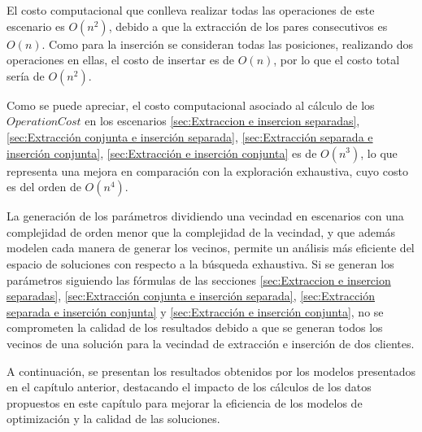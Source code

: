 \documentclass[12pt]{report}
\begin{document}
	El costo computacional que conlleva realizar todas las operaciones de este escenario es $O(n^2)$, debido a que la extracción de los pares consecutivos es $O(n)$. Como para la inserción se consideran todas las posiciones, realizando dos operaciones en ellas, el costo de insertar es de $O(n)$, por lo que el costo total sería de $O(n^2)$.

	Como se puede apreciar, el costo computacional asociado al cálculo de los $OperationCost$ en los escenarios \ref{sec:Extraccion e insercion separadas}, \ref{sec:Extracción conjunta e inserción separada}, \ref{sec:Extracción separada e inserción conjunta}, \ref{sec:Extracción e inserción conjunta} es de $O(n^3)$, lo que representa una mejora en comparación con la exploración exhaustiva, cuyo costo es del orden de $O(n^4)$.

	La generación de los parámetros dividiendo una vecindad en escenarios con una complejidad de orden menor que la complejidad de la vecindad, y que además modelen cada manera de generar los vecinos, permite un análisis más eficiente del espacio de soluciones con respecto a la búsqueda exhaustiva. Si se generan los parámetros siguiendo las fórmulas de las secciones \ref{sec:Extraccion e insercion separadas}, \ref{sec:Extracción conjunta e inserción separada}, \ref{sec:Extracción separada e inserción conjunta} y \ref{sec:Extracción e inserción conjunta}, no se comprometen la calidad de los resultados debido a que se generan todos los vecinos de una solución para la vecindad de extracción e inserción de dos clientes.

	A continuación, se presentan los resultados obtenidos por los modelos presentados en el capítulo anterior, destacando el impacto de los cálculos de los datos propuestos en este capítulo para mejorar la eficiencia de los modelos de optimización y la calidad de las soluciones.
\end{document}
